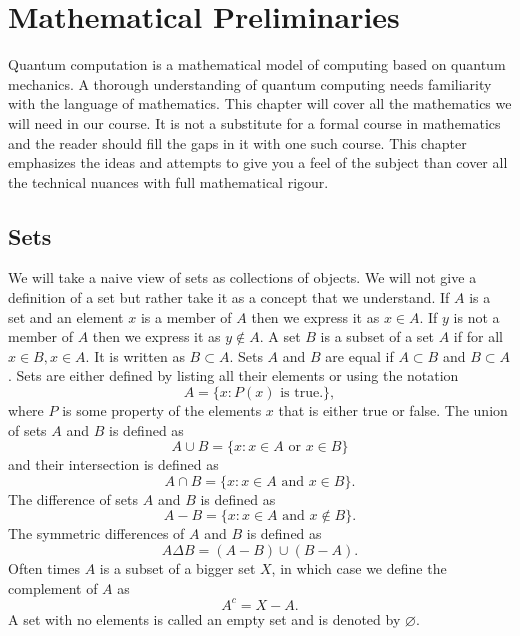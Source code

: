 \chapter{Mathematical Preliminaries}\label{c1}
Quantum computation is a mathematical model of computing based on quantum 
mechanics. A thorough understanding of quantum computing needs familiarity with 
the language of mathematics. This chapter will cover all the mathematics we 
will need in our course. It is not a substitute for a formal course in 
mathematics and the reader should fill the gaps in it with one such course. This
chapter emphasizes the ideas and attempts to give you a feel of the subject than
cover all the technical nuances with full mathematical rigour.

\section{Sets}\label{c1s1}
We will take a naive view of sets as collections of objects. We will not give a 
definition of a set but rather take it as a concept that we understand. If $A$ 
is a set and an element $x$ is a member of $A$ then we express it as $x \in A$. 
If $y$ is not a member of $A$ then we express it as $y \notin A$. A set $B$ is 
a subset of a set $A$ if for all $x \in B, x \in A$. It is written as $B \subset
 A$. Sets $A$ and $B$ are equal if $A \subset B$ and $B \subset A$. Sets are 
either defined by listing all their elements or using the notation
\[
A = \{x : P(x) \text{ is true.}\},
\]
where $P$ is some property of the elements $x$ that is either true or false. 
The union of sets $A$ and $B$ is defined as
\begin{equation}\label{c1s1e1}
A \cup B = \{x : x \in A \text{ or } x \in B\}
\end{equation}
and their intersection is defined as
\begin{equation}\label{c1s1e2}
A \cap B = \{x : x \in A \text{ and } x \in B\}.
\end{equation}
The difference of sets $A$ and $B$ is defined as
\begin{equation}\label{c1s1e3}
A - B = \{x : x \in A \text{ and } x \notin B\}.
\end{equation}
The symmetric differences of $A$ and $B$ is defined as
\begin{equation}\label{c1s2e4}
A \Delta B = (A - B) \cup (B - A).
\end{equation}
Often times $A$ is a subset of a bigger set $X$, in which case we define
the complement of $A$ as
\begin{equation}\label{c1s2e5}
A^c = X - A.
\end{equation}
A set with no elements is called an empty set and is denoted by $\varnothing$.


